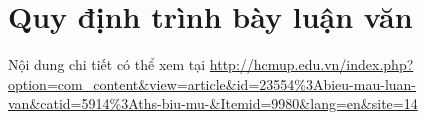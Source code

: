 \chapter{Quy định trình bày luận văn} \label{chap_quydinh}

Nội dung chi tiết có thể xem tại
\url{http://hcmup.edu.vn/index.php?option=com_content&view=article&id=23554%3Abieu-mau-luan-van&catid=5914%3Aths-biu-mu-&Itemid=9980&lang=en&site=14}

